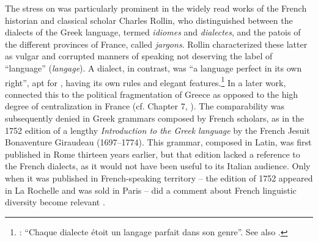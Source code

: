 The stress on  was particularly prominent in the widely read works of the French historian and classical scholar Charles Rollin, who distinguished between the dialects of the Greek language, termed \textit{idiomes} and \textit{dialectes}, and the patois of the different provinces of France, called \textit{jargons}. Rollin characterized these latter as vulgar and corrupted manners of speaking not deserving the label of “language” (\textit{langage}). A dialect, in contrast, was “a language perfect in its own right”, apt for , having its own rules and elegant features.\footnote{\citet[117]{Rollin1726}: “Chaque dialecte étoit un langage parfait dans son genre”. See also \citet[395]{Rollin1731}.} In a later work, \citet[395]{Rollin1731} connected this to the political fragmentation of Greece as opposed to the high degree of centralization in France (cf. Chapter 7, ). The comparability was subsequently denied in Greek grammars composed by French scholars, as in the 1752 edition of a lengthy \textit{Introduction to the Greek language} by the French Jesuit Bonaventure Giraudeau (1697–1774). This grammar, composed in Latin, was first published in Rome thirteen years earlier, but that edition lacked a reference to the French dialects, as it would not have been useful to its Italian audience. Only when it was published in French-speaking territory – the edition of 1752 appeared in La Rochelle and was sold in Paris – did a comment about French linguistic diversity become relevant \citep[117]{Giraudeau1752}.

